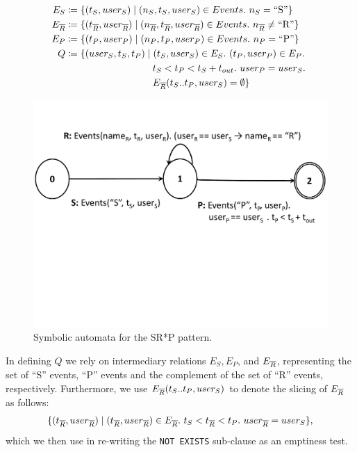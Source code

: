 \begin{align*}
E_S 
&\coloneq 
\{ (t_S, user_S) \mid 
   (n_S, t_S, user_S) \in Events .\ n_S = \text{``S''}
\}
\\
E_{\oR} 
&\coloneq 
\{ (t_{\oR}, user_{\oR}) \mid 
   (n_{\oR}, t_{\oR}, user_{\oR}) \in Events .\ n_{\oR} \neq \text{``R''}
\}
\\
E_P 
&\coloneq 
\{ (t_P, user_P) \mid 
   (n_P, t_P, user_P) \in Events .\ n_P = \text{``P''}
\}
\\
Q 
&\coloneq 
\{ (user_S, t_S, t_P) \mid 
   (t_S, user_S) \in E_S .\ 
   (t_P, user_P) \in E_P .\
\\ 
&\qqqquad\quad
    t_S < t_P < t_S + t_{out} .\ 
	user_P = user_S .\ 
\\
&\qqqquad\quad
	E_{\oR}(t_S..t_P, user_S) = \emptyset  
\}
\\
\end{align*}



\begin{figure}[t]
\centering
\includegraphics[clip, trim=0.5cm 10cm 0.5cm 3cm,width=\columnwidth]
{graphs/example_sm.pdf}
\caption{Symbolic automata for the SR*P pattern.}
\label{fig:srp_pattern}
\end{figure}

In defining $Q$ we rely on intermediary relations 
$E_S, E_P$, and $E_{\overline{R}}$, representing the set of ``S'' events, ``P'' events
and the complement of the set of ``R'' events, respectively.
Furthermore, we use $E_{\overline{R}}(t_S..t_P, user_S)$ to denote the slicing of
$E_{\overline{R}}$ as follows:
\begin{align*}
\{ (t_{\oR}, user_{\oR}) \mid 
   (t_{\oR}, user_{\oR}) \in E_{\oR} .\ 
   t_S < t_{\oR} < t_P .\ 
   user_{\oR} = user_S
\},
\end{align*}
which we then use in re-writing the \texttt{NOT EXISTS} sub-clause as an
emptiness test.


